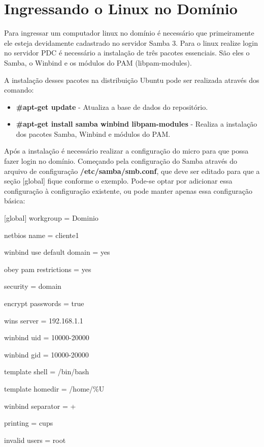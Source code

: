 
\section{Ingressando o Linux no Domínio}

Para ingressar um computador linux no domínio é necessário que primeiramente ele esteja devidamente cadastrado no servidor Samba 3. Para o linux realize login no servidor PDC é necessário a instalação de três pacotes essenciais. São eles o Samba, o Winbind e os módulos do PAM (libpam-modules).

A instalação desses pacotes na distribuição Ubuntu pode ser realizada através dos comando:

\begin{itemize}
	\item \textbf{\#apt-get update} - Atualiza a base de dados do repositório.
	\item \textbf{\#apt-get install samba winbind libpam-modules} - Realiza a instalação dos pacotes Samba, Winbind e módulos do PAM.
\end{itemize}

Após a instalação é necessário realizar a configuração do micro para que possa fazer login no domínio. Começando pela configuração do Samba através do arquivo de configuração \textbf{/etc/samba/smb.conf}, que deve ser editado para que a seção [global] fique conforme o exemplo. Pode-se optar por adicionar essa configuração à configuração existente, ou pode manter apenas essa configuração básica:

[global]
  	workgroup = Dominio

  	netbios name = cliente1

  	winbind use default domain = yes

  	obey pam restrictions = yes

  	security = domain

  	encrypt passwords = true

  	wins server = 192.168.1.1

  	winbind uid = 10000-20000

  	winbind gid = 10000-20000

  	template shell = /bin/bash

  	template homedir = /home/\%U

  	winbind separator = +

  	printing = cups

  	invalid users = root

